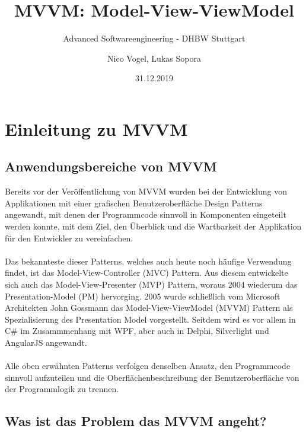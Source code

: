 \documentclass[titlepage=false,12pt]{scrreprt}
\title{MVVM: Model-View-ViewModel}
\subtitle{Advanced Softwareengineering - DHBW Stuttgart}
\author{Nico Vogel, Lukas Sopora}
\date{31.12.2019}
\begin{document}
\maketitle
	
{\renewcommand\clearpage\relax
	\tableofcontents}
\newpage

\chapter{Einleitung zu MVVM}

\section{Anwendungsbereiche von MVVM}

Bereits vor der Veröffentlichung von MVVM wurden bei der Entwicklung von Applikationen mit einer grafischen Benutzeroberfläche Design Patterns angewandt, 
mit denen der Programmcode sinnvoll in Komponenten eingeteilt werden konnte, mit dem Ziel, den Überblick und die Wartbarkeit der Applikation für den Entwickler zu vereinfachen.
\\\\
\noindent
Das bekannteste dieser Patterns, welches auch heute noch häufige Verwendung findet, ist das Model-View-Controller (MVC) Pattern.
Aus diesem entwickelte sich auch das Model-View-Presenter (MVP) Pattern, woraus 2004 wiederum das Presentation-Model (PM) hervorging.
2005 wurde schließlich vom Microsoft Architekten John Gossmann das Model-View-ViewModel (MVVM) Pattern als Spezialisierung des Presentation Model vorgestellt.
Seitdem wird es vor allem in C\# im Zusammmenhang mit WPF, aber auch in Delphi, Silverlight und AngularJS angewandt.
\\\\
\noindent
Alle oben erwähnten Patterns verfolgen denselben Ansatz, den Programmcode sinnvoll aufzuteilen und die Oberflächenbeschreibung der Benutzeroberfläche von der Programmlogik zu trennen. \par

\section{Was ist das Problem das MVVM angeht?}
\end{document}
